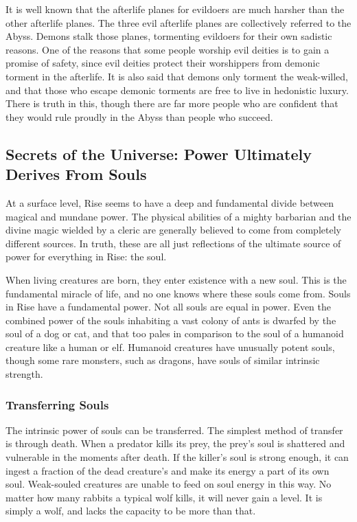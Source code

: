         It is well known that the afterlife planes for evildoers are much harsher than the other afterlife planes.
        The three evil afterlife planes are collectively referred to the Abyss.
        Demons stalk those planes, tormenting evildoers for their own sadistic reasons.
        One of the reasons that some people worship evil deities is to gain a promise of safety, since evil deities protect their worshippers from demonic torment in the afterlife.
        It is also said that demons only torment the weak-willed, and that those who escape demonic torments are free to live in hedonistic luxury.
        There is truth in this, though there are far more people who are confident that they would rule proudly in the Abyss than people who succeed.

    \subsection{Secrets of the Universe: Power Ultimately Derives From Souls}
        At a surface level, Rise seems to have a deep and fundamental divide between magical and mundane power.
        The physical abilities of a mighty barbarian and the divine magic wielded by a cleric are generally believed to come from completely different sources.
        In truth, these are all just reflections of the ultimate source of power for everything in Rise: the soul.

        When living creatures are born, they enter existence with a new soul.
        This is the fundamental miracle of life, and no one knows where these souls come from.
        Souls in Rise have a fundamental power.
        Not all souls are equal in power.
        Even the combined power of the souls inhabiting a vast colony of ants is dwarfed by the soul of a dog or cat, and that too pales in comparison to the soul of a humanoid creature like a human or elf.
        Humanoid creatures have unusually potent souls, though some rare monsters, such as dragons, have souls of similar intrinsic strength.

        \subsubsection{Transferring Souls}
            The intrinsic power of souls can be transferred.
            The simplest method of transfer is through death.
            When a predator kills its prey, the prey's soul is shattered and vulnerable in the moments after death.
            If the killer's soul is strong enough, it can ingest a fraction of the dead creature's and make its energy a part of its own soul.
            Weak-souled creatures are unable to feed on soul energy in this way.
            No matter how many rabbits a typical wolf kills, it will never gain a level.
            It is simply a wolf, and lacks the capacity to be more than that.

